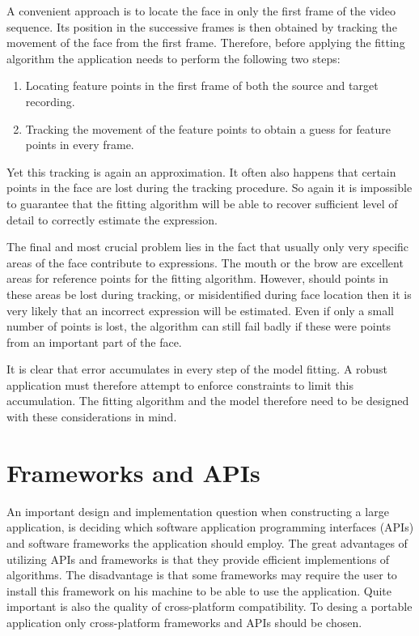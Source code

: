 \documentclass[11pt,a4paper,twoside]{report}
\begin{document}
A convenient approach is to locate the face in only the first frame of the video
sequence. Its position in the successive frames is then obtained by tracking the
movement of the face from the first frame. Therefore, before applying the
fitting algorithm the application needs to perform the following two steps:
\begin{enumerate}
\item Locating feature points in the first frame of both the source and target
  recording.
\item Tracking the movement of the feature points to obtain a guess for feature
  points in every frame.
\end{enumerate}

Yet this tracking is again an approximation. It often also happens that certain points in the face are lost
during the tracking procedure. So again it is impossible to guarantee that the
fitting algorithm will be able to recover sufficient level of detail to correctly estimate the expression.


The final and most crucial problem lies in the fact that usually only very specific
areas of the face contribute to expressions. The mouth or the brow are excellent
areas for reference points for the fitting algorithm. However, should points in these
areas be lost during tracking, or misidentified during face location then it is
very likely that an incorrect expression will be estimated. Even if only a small
number of points is lost, the algorithm can still fail badly if these were
points from an important part of the face.

It is clear that error accumulates in every step of the model
fitting. A robust application must therefore attempt to enforce constraints to limit this
accumulation. The fitting algorithm and the model therefore need to be designed
with these considerations in mind.

\section{Frameworks and APIs}
An important design and implementation question when constructing a large
application, is deciding which software application programming interfaces
(APIs) and software frameworks the application should employ. The
great advantages of utilizing APIs and frameworks is that they provide efficient
implementions of algorithms. The disadvantage is that some frameworks may
require the user to install this framework on his machine to be able to use the
application. Quite important is also the quality of cross-platform
compatibility. To desing a portable application only cross-platform
frameworks and APIs should be chosen.
\end{document}
